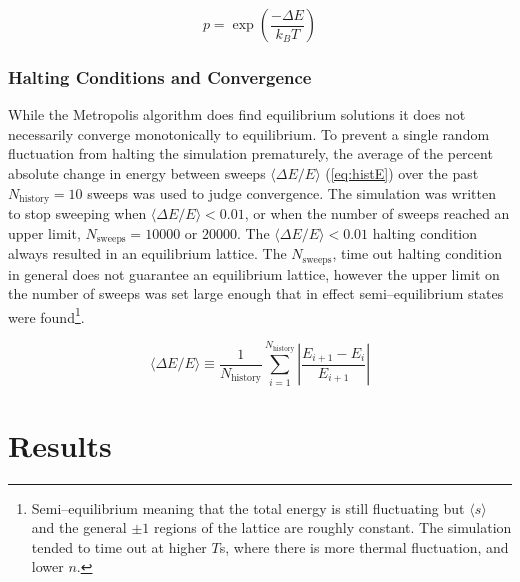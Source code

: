 \documentclass[notitlepage,aps,prd,nofootinbib]{revtex4-1}
\begin{document}
\begin{equation}
\label{eq:p}
p = \exp\left(\frac{-\Delta E}{k_{B} T}\right)
\end{equation}

\subsubsection{Halting Conditions and Convergence}
\label{subsubsec:convergence}
While the Metropolis algorithm does find equilibrium solutions it does not necessarily converge monotonically to equilibrium. To prevent a single random fluctuation from halting the simulation prematurely, the average of the percent absolute change in energy between sweeps $\langle \Delta E / E \rangle$ (\ref{eq:histE}) over the past $N_{\mathrm{history}} = 10$ sweeps was used to judge convergence. The simulation was written to stop sweeping when $\langle \Delta E / E \rangle < 0.01$, or when the number of sweeps reached an upper limit, $N_{\mathrm{sweeps}} = 10000$ or $20000$. The $\langle \Delta E / E \rangle < 0.01$ halting condition always resulted in an equilibrium lattice. The $N_{\mathrm{sweeps}}$, time out halting condition in general does not guarantee an equilibrium lattice, however the upper limit on the number of sweeps was set large enough that in effect semi--equilibrium states were found\footnote{Semi--equilibrium meaning that the total energy is still fluctuating but $\langle s \rangle$ and the general $\pm1$ regions of the lattice are roughly constant. The simulation tended to time out at higher $T$s, where there is more thermal fluctuation, and lower $n$.}.


\begin{equation}
\label{eq:histE}
\langle \Delta E / E \rangle \equiv \frac{1}{N_{\mathrm{history}}} \sum_{i=1}^{N_{\mathrm{history}}} \left|\frac{ E_{i+1} - E_{i}}{E_{i+1}}\right|
\end{equation}


\clearpage
\section{Results}
\label{sec:results}
\end{document}
